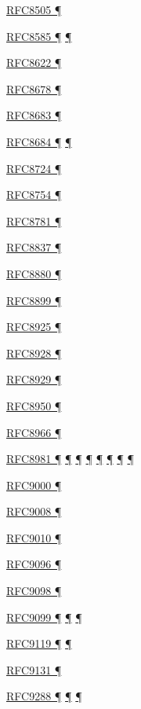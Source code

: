 \documentclass[
]{article}
\begin{document}
\hyperref[address-resolution]{RFC8505 ¶}

\hyperref[routing]{RFC8585 ¶} \hyperref[dual-stack-scenarios]{¶}

\hyperref[traffic-class-and-flow-label]{RFC8622 ¶}

\hyperref[multi-prefix-operation]{RFC8678 ¶}

\hyperref[translation-and-ipv4-as-a-service]{RFC8683 ¶}

\hyperref[transport-protocols]{RFC8684 ¶} \hyperref[multihoming]{¶}

\hyperref[energy-consumption]{RFC8724 ¶}

\hyperref[extension-headers-and-options]{RFC8754 ¶}

\hyperref[translation-and-ipv4-as-a-service]{RFC8781 ¶}

\hyperref[traffic-class-and-flow-label]{RFC8837 ¶}

\hyperref[translation-and-ipv4-as-a-service]{RFC8880 ¶}

\hyperref[extension-headers-and-options]{RFC8899 ¶}

\hyperref[dual-stack-scenarios]{RFC8925 ¶}

\hyperref[address-resolution]{RFC8928 ¶}

\hyperref[address-resolution]{RFC8929 ¶}

\hyperref[routing]{RFC8950 ¶}

\hyperref[routing]{RFC8966 ¶}

\hyperref[addresses]{RFC8981 ¶} \hyperref[auto-configuration]{¶}
\hyperref[layer-2-considerations]{¶} \hyperref[topology-obfuscation]{¶}
\hyperref[prefix-per-host]{¶}
\hyperref[address-and-prefix-management]{¶}
\hyperref[multi-prefix-operation]{¶} \hyperref[security-operation]{¶}

\hyperref[transport-protocols]{RFC9000 ¶}

\hyperref[routing]{RFC9008 ¶}

\hyperref[routing]{RFC9010 ¶}

\hyperref[routing]{RFC9096 ¶}

\hyperref[extension-headers-and-options]{RFC9098 ¶}

\hyperref[security]{RFC9099 ¶}
\hyperref[address-and-prefix-management]{¶}
\hyperref[security-operation]{¶}

\hyperref[address-resolution]{RFC9119 ¶} \hyperref[layer-2-functions]{¶}

\hyperref[address-resolution]{RFC9131 ¶}

\hyperref[extension-headers-and-options]{RFC9288 ¶}
\hyperref[filtering]{¶} \hyperref[security-operation]{¶}
\end{document}
